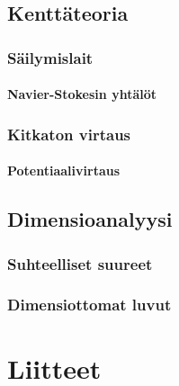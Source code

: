 \documentclass[12pt,a4paper,finnish]{book}
\begin{document}
\chapter{Kenttäteoria}
\section{Säilymislait}
\subsection{Navier-Stokesin yhtälöt}
\section{Kitkaton virtaus}
\subsection{Potentiaalivirtaus}

\chapter{Dimensioanalyysi}
\section{Suhteelliset suureet}
\section{Dimensiottomat luvut}

\part*{Liitteet} %

% 
% 
\end{document}
